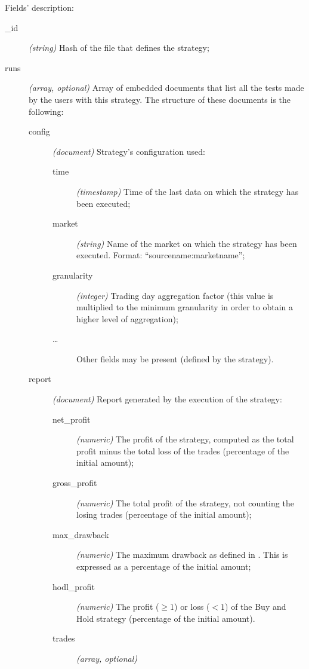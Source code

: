 Fields' description:
\begin{description}
	\item[\_id] \textit{(string)} Hash of the file that defines the
		strategy;
	\item[runs] \textit{(array, optional)} Array of embedded documents that
		list all the tests made by the users with this strategy. The
		structure of these documents is the following:
		\begin{description}
			\item[config] \textit{(document)} Strategy's
				configuration used:
				\begin{description}
					\item[time]
						\textit{(timestamp)} Time of the
						last data on which the strategy
						has been executed;
					\item[market] \textit{(string)} Name of
						the market on which the strategy
						has been executed. Format:
						\enquote{sourcename:marketname};
					\item[granularity] \textit{(integer)}
						Trading day aggregation factor
						(this value is multiplied to the
						minimum granularity in order to
						obtain a higher level of
						aggregation);
					\item[\ldots] Other fields may be
						present (defined by the
						strategy).
				\end{description}
			\item[report] \textit{(document)} Report generated by
				the execution of the strategy:
				\begin{description}
					\item[net\_profit] \textit{(numeric)}
						The profit of the strategy,
						computed as the total profit
						minus the total loss of the
						trades (percentage of the
						initial amount);
					\item[gross\_profit] \textit{(numeric)}
						The total profit of the
						strategy, not counting the
						losing trades (percentage of the
						initial amount);
					\item[max\_drawback] \textit{(numeric)}
						The maximum drawback as defined
						in . This is
						expressed as a percentage of the
						initial amount;
					\item[hodl\_profit] \textit{(numeric)}
						The profit (\(\ge 1\)) or
						loss (\(< 1\)) of the Buy and
						Hold strategy (percentage of the
						initial amount).
					\item[trades] \textit{(array, optional)}

\end{description}
\end{description}
\end{description}
